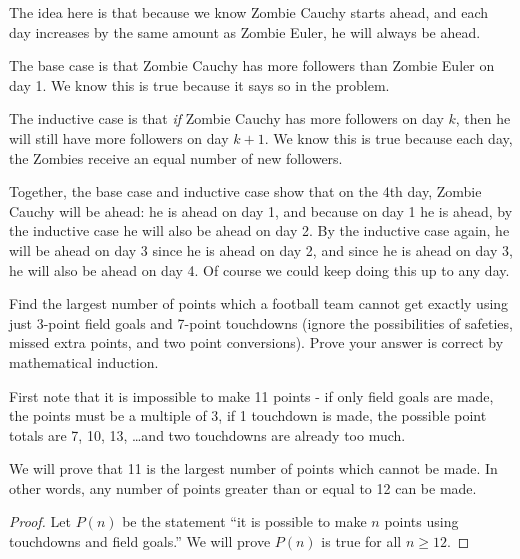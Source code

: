 \begin{questions}
\begin{solution}
  The idea here is that because we know Zombie Cauchy starts ahead, and each day increases by the same amount as Zombie Euler, he will always be ahead.
  
   The base case is that Zombie Cauchy has more followers than Zombie Euler on day 1.  We know this is true because it says so in the problem.
    
    The inductive case is that {\em if} Zombie Cauchy has more followers on day $k$, then he will still have more followers on day $k+1$.  We know this is true because each day, the Zombies receive an equal number of new followers. 
    
    Together, the base case and inductive case show that on the 4th day, Zombie Cauchy will be ahead: he is ahead on day 1, and because on day 1 he is ahead, by the inductive case he will also be ahead on day 2.  By the inductive case again, he will be ahead on day 3 since he is ahead on day 2, and since he is ahead on day 3, he will also be ahead on day 4.  Of course we could keep doing this up to any day.
\end{solution}


\question Find the largest number of points which a football team cannot get exactly using just 3-point field goals and 7-point touchdowns (ignore the possibilities of safeties, missed extra points, and two point conversions).  Prove your answer is correct by mathematical induction.

\begin{solution}
  First note that it is impossible to make 11 points - if only field goals are made, the points must be a multiple of 3, if 1 touchdown is made, the possible point totals are 7, 10, 13, \ldots and two touchdowns are already too much.
  
  We will prove that 11 is the largest number of points which cannot be made.  In other words, any number of points greater than or equal to 12 can be made.
  
  \begin{proof}
    Let $P(n)$ be the statement ``it is possible to make $n$ points using touchdowns and field goals.''  We will prove $P(n)$ is true for all $n \ge 12$.
    

\end{proof}
\end{solution}
\end{questions}
